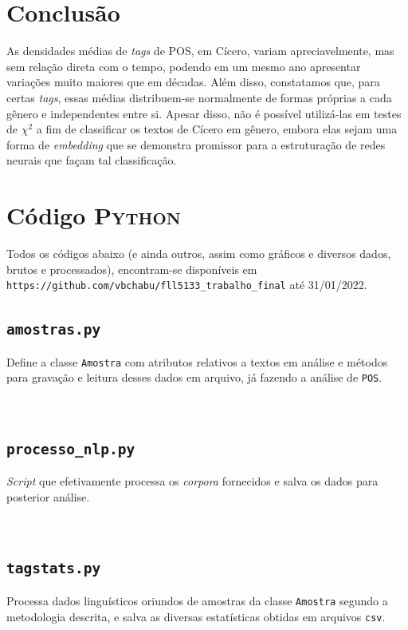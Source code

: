 \documentclass[10pt,a4paper,onecolumn]{article}
\theoremstyle{definition}
\theoremstyle{remark}
\begin{document}
\section{Conclusão}
As densidades médias de \emph{tags} de POS, em Cícero, variam apreciavelmente, mas sem relação direta com o tempo, podendo em um mesmo ano apresentar variações muito maiores que em décadas. Além disso, constatamos que, para certas \emph{tags}, essas médias distribuem-se normalmente de formas próprias a cada gênero e independentes entre si. Apesar disso, não é possível utilizá-las em testes de $\chi^2$ a fim de classificar os textos de Cícero em gênero, embora elas sejam uma forma de \emph{embedding} que se demonstra promissor para a estruturação de redes neurais que façam tal classificação.

\appendix
\newpage
\section{Código \textsc{Python}}\label{ap:python}
\noindent
Todos os códigos abaixo (e ainda outros, assim como gráficos e diversos dados, brutos e processados), encontram-se disponíveis em \texttt{https://github.com/vbchabu/fll5133\_trabalho\_final} até 31/01/2022.

\subsection{\texttt{amostras.py}}
\noindent
Define a classe \texttt{Amostra} com atributos relativos a textos em análise e métodos para gravação e leitura desses dados em arquivo, já fazendo a análise de \texttt{POS}.

\

\subsection{\texttt{processo\_nlp.py}}
\noindent
\emph{Script} que efetivamente processa os \emph{corpora} fornecidos e salva os dados para posterior análise.

\

\subsection{\texttt{tagstats.py}}\label{ap:tagstats}
\noindent
Processa dados linguísticos oriundos de amostras da classe \texttt{Amostra} segundo a metodologia descrita, e salva as diversas estatísticas obtidas em arquivos \texttt{csv}.

\
\end{document}
